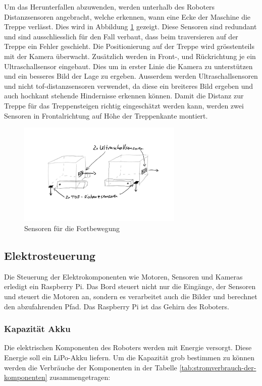Um das Herunterfallen abzuwenden, werden unterhalb des Roboters Distanzsensoren angebracht, welche erkennen, wann eine Ecke der Maschine die Treppe verlässt. Dies wird in Abbildung \ref{fig:sensoren-fortbewegung1} gezeigt. Diese Sensoren sind redundant und sind ausschliesslich für den Fall verbaut, dass beim traversieren auf der Treppe ein Fehler geschieht.
Die Positionierung auf der Treppe wird grösstenteils mit der Kamera überwacht. Zusätzlich werden in Front-, und Rückrichtung je ein Ultraschallsensor eingebaut. Dies um in erster Linie die Kamera zu unterstützen und ein besseres Bild der Lage zu ergeben. Ausserdem werden Ultraschallsensoren und nicht \acrshort{tof}-distanzsensoren verwendet, da diese ein breiteres Bild ergeben und auch hochkant stehende Hindernisse erkennen können.
Damit die Distanz zur Treppe für das Treppensteigen richtig eingeschätzt werden kann, werden zwei Sensoren in Frontalrichtung auf Höhe der Treppenkante montiert.

\begin{figure}[h]
  \includegraphics[width=0.7\textwidth]{img/Fortbewegung/Skizze_Sensoren_Fortbewegung_1.png}
  \centering
  \caption{Sensoren für die Fortbewegung}
  \label{fig:sensoren-fortbewegung1}
\end{figure}


\newpage
\subsection{Elektrosteuerung}
Die Steuerung der Elektrokomponenten wie Motoren, Sensoren und Kameras erledigt ein Raspberry Pi. Das Bord steuert nicht nur die Eingänge, der Sensoren und steuert die Motoren an, sondern es verarbeitet auch die Bilder und berechnet den abzufahrenden Pfad. Das Raspberry Pi ist das Gehirn des Roboters.

\newpage
\subsubsection{Kapazität Akku}
Die elektrischen Komponenten des Roboters werden mit Energie versorgt. Diese Energie soll ein LiPo-Akku liefern. Um die Kapazität grob bestimmen zu können werden die Verbräuche der Komponenten in der Tabelle \ref{tab:stromverbrauch-der-komponenten} zusammengetragen:   

